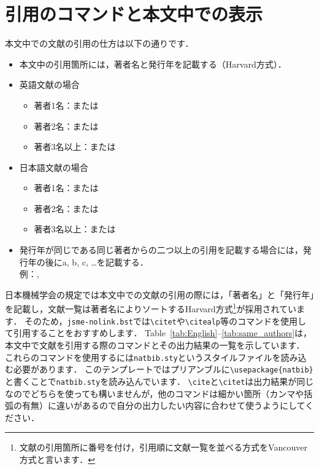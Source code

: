 \documentclass[a4paper,fleqn,uplatex,dvipdfmx]{jsarticle}
\newcommand{\jsmefile}{\texttt{jsme-nolink.bst}}
\begin{document}
\clearpage
\section{引用のコマンドと本文中での表示}
\label{sec:cite}
本文中での文献の引用の仕方は以下の通りです．
\begin{tcolorbox}[enhanced, title=\textgt{本文中での引用の仕方}, drop fuzzy shadow]
    \begin{itemize}
        \item 本文中の引用箇所には，著者名と発行年を記載する（Harvard方式）．
        \item 英語文献の場合
        \begin{itemize}
            \item 著者1名：\citet{Reynolds:PhilTransRoySoc1883}または\citep{Reynolds:PhilTransRoySoc1883}
            \item 著者2名：\citet{Schmid:Springer2001}または\citep{Schmid:Springer2001}
            \item 著者3名以上：\citet{Berghout:JFM2020}または\citep{Berghout:JFM2020}
        \end{itemize}
        \item 日本語文献の場合
        \begin{itemize}
            \item 著者1名：\citet{塚原:ながれ2023}または\citep{塚原:ながれ2023}
            \item 著者2名：\citet{塚原:ながれ2015}または\citep{塚原:ながれ2015}
            \item 著者3名以上：\citet{塚原:伝熱2007}または\citep{塚原:伝熱2007}
        \end{itemize}
        \item 発行年が同じである同じ著者からの二つ以上の引用を記載する場合には，発行年の後にa, b, c, \ldots を記載する． \\
        例：\citet{Matsukawa:ICFD2022}, \citet{松川:東北大SENAC2022}
    \end{itemize}
\end{tcolorbox}

日本機械学会の規定では本文中での文献の引用の際には，「著者名」と「発行年」を記載し，文献一覧は著者名によりソートするHarvard方式\footnote{文献の引用箇所に番号を付け，引用順に文献一覧を並べる方式をVancouver方式と言います．}が採用されています．
そのため，\jsmefile では\verb|\citet|や\verb|\citealp|等のコマンドを使用して引用することをおすすめします．
Table~\ref{tab:English}--\ref{tab:same_authors}は，本文中で文献を引用する際のコマンドとその出力結果の一覧を示しています．
これらのコマンドを使用するには\verb|natbib.sty|というスタイルファイルを読み込む必要があります．
このテンプレートではプリアンブルに\verb|\usepackage{natbib}|と書くことで\verb|natbib.sty|を読み込んでいます．
\verb|\cite|と\verb|\citet|は出力結果が同じなのでどちらを使っても構いませんが，他のコマンドは細かい箇所（カンマや括弧の有無）に違いがあるので自分の出力したい内容に合わせて使うようにしてください．
\end{document}

